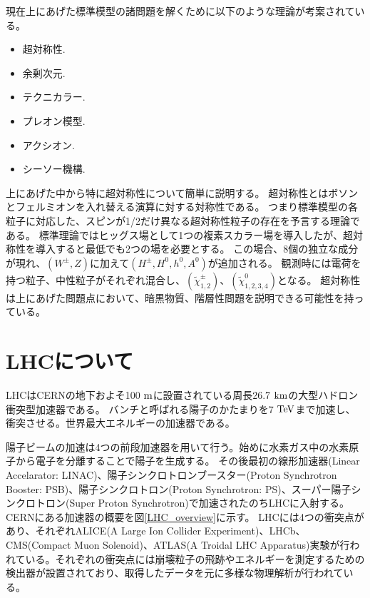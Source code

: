 現在上にあげた標準模型の諸問題を解くために以下のような理論が考案されている。
\begin{itemize}
  \item 超対称性.
  \item 余剰次元.
  \item テクニカラー.
  \item プレオン模型.
  \item アクシオン.
  \item シーソー機構.
\end{itemize}

上にあげた中から特に超対称性\cite{1-11}について簡単に説明する。
超対称性とはボソンとフェルミオンを入れ替える演算に対する対称性である。
つまり標準模型の各粒子に対応した、スピンが1/2だけ異なる超対称性粒子の存在を予言する理論である。
標準理論ではヒッグス場として1つの複素スカラー場を導入したが、超対称性を導入すると最低でも2つの場を必要とする。
この場合、8個の独立な成分が現れ、$(W^{\pm},Z)$に加えて$(H^{\pm},H^0,h^0,A^0)$が追加される。
観測時には電荷を持つ粒子、中性粒子がそれぞれ混合し、$(\widetilde{\chi}^{\pm}_{1,2})$、$(\widetilde{\chi}^{0}_{1,2,3,4})$となる。
超対称性は上にあげた問題点において、暗黒物質、階層性問題を説明できる可能性を持っている。



\clearpage
\section{LHCについて}
LHCはCERNの地下およそ100 $\rm{m}$に設置されている周長26.7 $\rm{km}$の大型ハドロン衝突型加速器である。
バンチと呼ばれる陽子のかたまりを7 $\rm{TeV}$まで加速し、衝突させる。世界最大エネルギーの加速器である。

陽子ビームの加速は4つの前段加速器を用いて行う。始めに水素ガス中の水素原子から電子を分離することで陽子を生成する。
その後最初の線形加速器(Linear Accelarator: LINAC)、陽子シンクロトロンブースター(Proton Synchrotron Booster: PSB)、陽子シンクロトロン(Proton Synchrotron: PS)、スーパー陽子シンクロトロン(Super Proton Synchrotron)で加速されたのちLHCに入射する。CERNにある加速器の概要を図\ref{LHC_overview}に示す。
LHCには4つの衝突点があり、それぞれALICE(A Large Ion Collider Experiment)、LHCb、CMS(Compact Muon Solenoid)、ATLAS(A
Troidal LHC Apparatus)実験が行われている。それぞれの衝突点には崩壊粒子の飛跡やエネルギーを測定するための検出器が設置されており、取得したデータを元に多様な物理解析が行われている。

